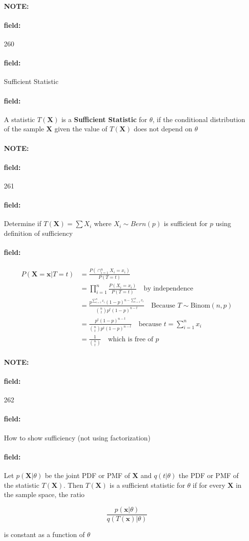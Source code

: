 \documentclass[12pt]{article}
\newenvironment{note}{\paragraph{NOTE:}}{}
\newenvironment{field}{\paragraph{field:}}{}
\begin{document}
\begin{note} \begin{field} \tiny 260 \end{field}
  \begin{field}
    Sufficient Statistic
  \end{field}
  \begin{field}
    A statistic $T(\mathbf{X})$ is a \textbf{Sufficient Statistic} for $\theta$, if the conditional distribution of the sample $\mathbf{X}$ given the value of $T(\mathbf{X})$ does not depend on $\theta$
  \end{field}
\end{note}

\begin{note} \begin{field} \tiny 261 \end{field}
  \begin{field}
    Determine if $T(\mathbf{X}) = \sum X_i$ where $X_i\sim Bern(p)$ is sufficient for $p$ using definition of sufficiency
  \end{field}
  \begin{field}
    \begin{align*}
      P(\mathbf{X} = \mathbf{x}\big| T = t) &= \frac{P(\cap_{i = 1}^n X_i = x_i)}{P(T = t)}\\
      &= \prod_{i = 1}^n \frac{P(X_i = x_i)}{P(T = t)} \quad \text{by independence}\\
      &= \frac{p^{\sum_{i = 1}^n x_i}(1 - p)^{n - \sum_{i = 1}^n x_i}}{\binom{n}{t}p^t(1 -p)^{n-t}} \quad \text{Because } T \sim \text{Binom}(n,p)\\
      &= \frac{p^t(1-p)^{n-t}}{\binom{n}{t}p^t(1-p)^{n-t}} \quad \text{because }t = \sum_{i = 1}^n x_i\\
      &= \frac{1}{\binom{n}{t}} \quad \text{which is free of  }p
    \end{align*}
  \end{field}
\end{note}

\begin{note} \begin{field} \tiny 262 \end{field}
  \begin{field}
    How to show sufficiency (not using factorization)
  \end{field}
  \begin{field}
    Let $p(\mathbf{X}|\theta)$ be the joint PDF or PMF of $\mathbf{X}$ and $q(t|\theta)$ the PDF or PMF of the statistic $T(\mathbf{X})$. Then $T(\mathbf{X})$ is a sufficient statistic for $\theta$ if for every $\mathbf{X}$ in the sample space, the ratio

    $$ \frac{p(\mathbf{x}|\theta)}{q(T(\mathbf{x})|\theta)}$$

    is constant as a function of $\theta$
  \end{field}
\end{note}
\end{document}
